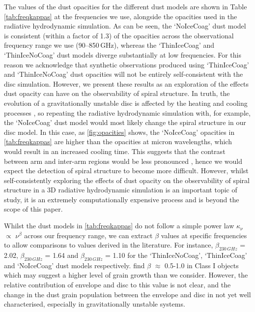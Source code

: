\documentclass[fleqn,usenatbib]{mnras}
\begin{document}
The values of the dust opacities for the different dust models are shown in Table \ref{tab:freqkappas} at the frequencies we use, alongside the \cite{D'Alessio&Calvet2001} opacities used in the radiative hydrodynamic simulation. As can be seen, the `NoIceCoag' dust model is consistent (within a factor of 1.3) of the \citet{D'Alessio&Calvet2001} opacities across the observational frequency range we use (90--850\,GHz), whereas the `ThinIceCoag' and `ThinIceNoCoag' dust models diverge substantially at low frequencies. For this reason we acknowledge that synthetic observations produced using `ThinIceCoag' and `ThinIceNoCoag' dust opacities will not be entirely self-consistent with the disc simulation. However, we present these results as an exploration of the effects dust opacity can have on the observability of spiral structure. In truth, the evolution of a gravitationally unstable disc is affected by the heating and cooling processes \citep[see][]{Kratter&Lodato2016}, so repeating the radiative hydrodynamic simulation with, for example, the `NoIceCoag' dust model would most likely change the spiral structure in our disc model. In this case, as \autoref{fig:opacities} shows, the `NoIceCoag' opacities in \autoref{tab:freqkappas} are higher than the \citet{D'Alessio&Calvet2001} opacities at micron wavelengths, which would result in an increased cooling time. This suggests that the contrast between arm and inter-arm regions would be less pronounced \citep{Cossins&Lodato2009}, hence we would expect the detection of spiral structure to become more difficult. However, whilst self-consistently exploring the effects of dust opacity on the observability of spiral structure in a 3D radiative hydrodynamic simulation is an important topic of study, it is an extremely computationally expensive process and is beyond the scope of this paper.

\smallskip

Whilst the dust models in \autoref{tab:freqkappas} do not follow a simple power law $\kappa_\nu$ $\propto$ $\nu^\beta$ across our frequency range, we can extract $\beta$ values at specific frequencies to allow comparisons to values derived in the literature. For instance, $\beta_{230\,GHz}$ = 2.02, $\beta_{230\,GHz}$ = 1.64 and $\beta_{230\,GHz}$ = 1.10 for the `ThinIceNoCoag', `ThinIceCoag' and `NoIceCoag' dust models respectively. \citet{Miotello&Testi2014} find $\beta$ $\approx$ 0.5-1.0 in Class I objects which may suggest a higher level of grain growth than we consider. However, the relative contribution of envelope and disc to this value is not clear, and the change in the dust grain population between the envelope and disc in not yet well characterised, especially in gravitationally unstable systems.
\end{document}
